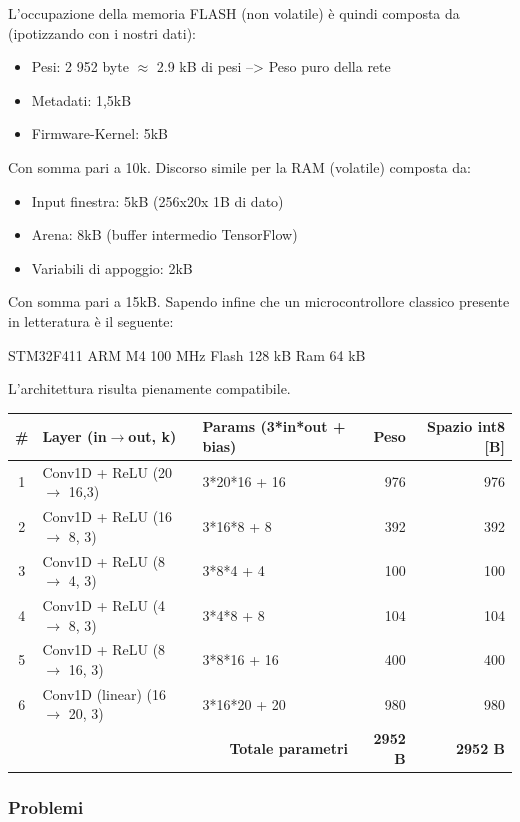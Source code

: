L’occupazione della memoria FLASH (non volatile) è quindi composta da (ipotizzando con i nostri dati):
\begin{itemize}
    \item Pesi: 2 952 byte $\approx$ 2.9 kB di pesi --> Peso puro della rete
    \item Metadati: 1,5kB
    \item Firmware-Kernel: 5kB
\end{itemize}
Con somma pari a 10k.
Discorso simile per la RAM (volatile) composta da:
\begin{itemize}
    \item Input finestra: 5kB (256x20x 1B di dato)
    \item Arena: 8kB (buffer intermedio TensorFlow)
    \item Variabili di appoggio: 2kB
\end{itemize}
Con somma pari a 15kB. Sapendo infine che un microcontrollore classico presente in letteratura è il seguente:
\begin{center}
    STM32F411 ARM M4 100 MHz Flash 128 kB Ram 64 kB
\end{center}
L’architettura risulta pienamente compatibile.

\begin{table}[h]
\centering
\begin{tabular}{c l l r r}
\toprule
\# & Layer (in$\to$out, k)        & Params (3*in*out + bias) & Peso & Spazio int8 [B] \\
\midrule
1 & Conv1D + ReLU (20 $\to$ 16,3) & 3*20*16 + 16 & 976 & 976 \\
2 & Conv1D + ReLU (16 $\to$ 8, 3)  & 3*16*8 + 8   & 392 & 392 \\
3 & Conv1D + ReLU (8 $\to$ 4, 3)   & 3*8*4 + 4    & 100 & 100 \\
4 & Conv1D + ReLU (4 $\to$ 8, 3)   & 3*4*8 + 8    & 104 & 104 \\
5 & Conv1D + ReLU (8 $\to$ 16, 3)  & 3*8*16 + 16  & 400 & 400 \\
6 & Conv1D (linear) (16 $\to$ 20, 3) & 3*16*20 + 20 & 980 & 980 \\
\midrule
\multicolumn{3}{r}{\textbf{Totale parametri}} & \textbf{2952 B} & \textbf{2952 B} \\
\bottomrule
\end{tabular}
\end{table}

\subsubsection{Problemi}

